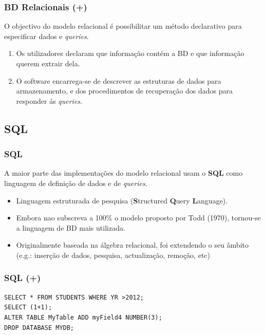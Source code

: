 \documentclass[hyperref={pdfpagelabels=true}]{beamer}
\begin{document}
\begin{frame}
\frametitle{BD Relacionais (+)}
O objectivo do modelo relacional \'{e} possibilitar um m\'{e}todo declarativo para especificar dados e \textit{queries}.
  \begin{enumerate}
  \item<2-> Os utilizadores declaram que informa\c{c}\~{a}o cont\'{e}m a BD e que informa\c{c}\~{a}o querem extrair dela.
  \item<3-> O software encarrega-se de descrever as estruturas de dados para armazenamento, e dos procedimentos de recupera\c{c}\~{a}o dos dados para responder \'{a}s \textit{queries}.
  \end{enumerate}
\end{frame}

\subsection{SQL}
\begin{frame}
\frametitle{SQL}
A maior parte das implementa\c{c}\~{o}es do modelo relacional usam o \textbf{SQL} como linguagem de defini\c{c}\~{a}o de dados e de \textit{queries}.
  \begin{itemize}
  \item<2-> Linguagem estruturada de pesquisa (\textbf{S}tructured \textbf{Q}uery \textbf{L}anguage).
  \item<3-> Embora nao subscreva a 100\% o modelo proposto por Todd (1970), tornou-se a linguagem de BD mais utilizada.
  \item<4-> Originalmente baseada na \'{a}lgebra relacional, foi extendendo o seu \^{a}mbito (e.g.: inser\c{c}\~{a}o de dados, pesquisa, actualiza\c{c}\~{a}o, remo\c{c}\~{a}o, etc)
  \end{itemize}
\end{frame}

\begin{frame}[fragile]
\frametitle{SQL (+)}
\lstset{language=SQL}
\begin{lstlisting}
SELECT * FROM STUDENTS WHERE YR >2012;
SELECT (1+1);
ALTER TABLE MyTable ADD myField4 NUMBER(3);
DROP DATABASE MYDB; 
\end{lstlisting}
\end{frame}
\end{document}
